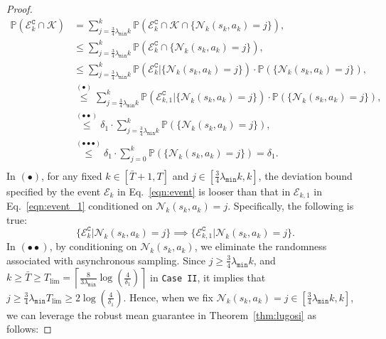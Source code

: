 \documentclass{article}
\begin{document}
\begin{proof}
\begin{equation}
\begin{aligned}\label{eqn:decom_2}
    \mathbb{P}(\mathcal{E}_k^{\texttt{C}} \cap \mathcal{K}) &= \sum_{j = \frac{3}{4}\lambda_{\texttt{min}} k}^{k} \mathbb{P}\left( \mathcal{E}_k^{\texttt{C}} \cap \mathcal{K} \cap \{\mathcal{N}_k(s_k,a_k)=j\}\right),\\ 
    &\le \sum_{j = \frac{3}{4}\lambda_{\texttt{min}}k}^{k}\mathbb{P}\left( \mathcal{E}_k^{\texttt{C}} \cap \{\mathcal{N}_k(s_k,a_k)=j\}\right),\\
    &\le \sum_{j = \frac{3}{4}\lambda_{\texttt{min}}k}^{k}\mathbb{P}\left( \mathcal{E}_k^{\texttt{C}} \lvert \{\mathcal{N}_k(s_k,a_k)=j\}\right)\cdot\mathbb{P}\left(\{\mathcal{N}_k(s_k,a_k)=j\}\right),\\
    &\overset{(\bullet)}{\le} \sum_{j = \frac{3}{4}\lambda_{\texttt{min}}k}^{k}\mathbb{P}\left( \mathcal{E}_{k,1}^{\texttt{C}} \lvert \{\mathcal{N}_k(s_k,a_k)=j\}\right)\cdot\mathbb{P}\left(\{\mathcal{N}_k(s_k,a_k)=j\}\right),\\
    & \overset{(\bullet \bullet)}{\le} \delta_1 \cdot \sum_{j = \frac{3}{4}\lambda_{\texttt{min}}k}^{k} \mathbb{P}\left(\{\mathcal{N}_k(s_k,a_k)=j\}\right), \\
    & \overset{(\bullet \bullet \bullet)}{\le} \delta_1 \cdot \sum_{j = 0}^{k} \mathbb{P}\left(\{\mathcal{N}_k(s_k,a_k)=j\}\right) =  \delta_1. \\
\end{aligned}
\end{equation}
In \((\bullet)\), for any fixed $k \in [\bar{T}+1, T]$ and $j \in \left[\frac{3}{4} \lambda_{\texttt{min}} k, k\right]$, the deviation bound specified by the event $\mathcal{E}_k$ in Eq.~\eqref{eqn:event} is looser than that in $\mathcal{E}_{k,1}$ in Eq.~\eqref{eqn:event_1} conditioned on $\mathcal{N}_k(s_k,a_k)=j$. Specifically, the following is true:
\begin{equation}
\{\mathcal{E}_k^{\texttt{C}} \lvert \mathcal{N}_k(s_k,a_k) = j\} \implies \{\mathcal{E}_{k,1}^{\texttt{C}} \lvert \mathcal{N}_k(s_k,a_k) = j\}.
\end{equation}
In \((\bullet \bullet)\), by conditioning on \(\mathcal{N}_k(s_k, a_k)\), we eliminate the randomness associated with asynchronous sampling. Since \( j \geq \frac{3}{4} \lambda_{\texttt{min}}k\), and \( k \geq \bar{T} \geq T_{\text{lim}} = \left \lceil{\frac{8}{3\lambda_{\texttt{min}}} \log\left(\frac{4}{\delta_1}\right)} \right \rceil\) in \texttt{Case II}, it implies that \( j \geq \frac{3}{4} \lambda_{\texttt{min}} T_{\text{lim}} \overset{}{\geq} 2 \log\left(\frac{4}{\delta_1}\right) \). Hence, when we fix \(\mathcal{N}_k(s_k, a_k) = j \in \left[\frac{3}{4} \lambda_{\texttt{min}}k, k\right]\), we can leverage the robust mean guarantee in Theorem~\ref{thm:lugosi} as follows:

\end{proof}
\end{document}
